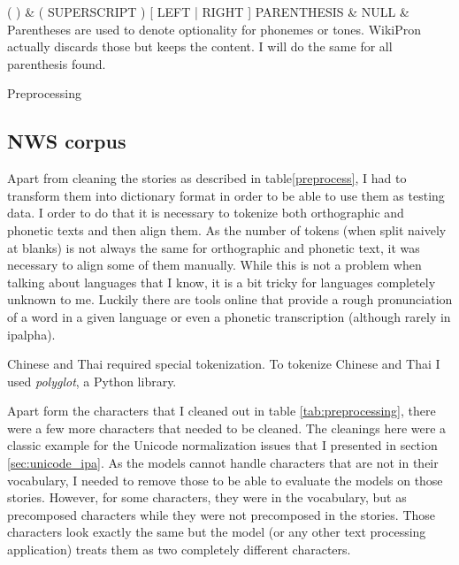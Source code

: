 {\begin{tabularx}{\textwidth}
\hline
( ) 						& \scriptsize{( SUPERSCRIPT ) [ LEFT | RIGHT ] PARENTHESIS}		& NULL							& Parentheses are used to denote optionality for phonemes or tones. WikiPron actually discards those but keeps the content. I will do the same for all parenthesis found.  \\\hline
\end{tabularx}}{Preprocessing}

\subsection*{NWS corpus}
Apart from cleaning the stories as described in table\ref{preprocess}, I had to transform them into dictionary format in order to be able to use them as testing data. I order to do that it is necessary to tokenize both orthographic and phonetic texts and then align them. As the number of tokens (when split naively at blanks) is not always the same for orthographic and phonetic text, it was necessary to align some of them manually. While this is not a problem when talking about languages that I know, it is a bit tricky for languages completely unknown to me. Luckily there are tools online that provide a rough pronunciation of a word in a given language or even a phonetic transcription (although rarely in \ac{ipalpha}). 

Chinese and Thai required special tokenization. To tokenize Chinese and Thai I used \textit{polyglot}, a Python library.

Apart form the characters that I cleaned out in table \ref{tab:preprocessing}, there were a few more characters that needed to be cleaned. The cleanings here were a classic example for the Unicode normalization issues that I presented in section \ref{sec:unicode_ipa}. As the models cannot handle characters that are not in their vocabulary, I needed to remove those to be able to evaluate the models on those stories. However, for some characters, they were in the vocabulary, but as precomposed characters while they were not precomposed in the stories. Those characters look exactly the same but the model (or any other text processing application) treats them as two completely different characters. 


